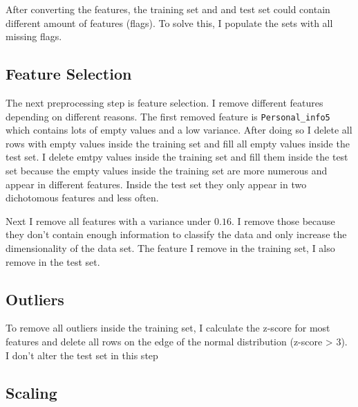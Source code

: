 

After converting the features, the training set and and test set could contain different amount of features (flags). To solve this, I populate the sets with all missing flags.



\subsection{Feature Selection}
The next preprocessing step is feature selection. I remove different features depending on different reasons. The first removed feature is \texttt{Personal\_info5} which contains lots of empty values and a low variance. After doing so I delete all rows with empty values inside the training set and fill all empty values inside the test set. I delete emtpy values inside the training set and fill them inside the test set because the empty values inside the training set are more numerous and appear in different features. Inside the test set they only appear in two dichotomous features and less often.



Next I remove all features with a variance under $0.16$. I remove those because they don't contain enough information to classify the data and only increase the dimensionality of the data set. The feature I remove in the training set, I also remove in the test set. 



\subsection{Outliers}

To remove all outliers inside the training set, I calculate the z-score for most features and delete all rows on the edge of the normal distribution (z-score > 3).
I don't alter the test set in this step

\subsection{Scaling}

